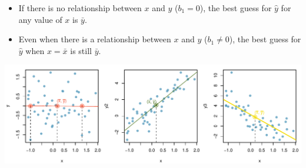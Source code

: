 \documentclass[slidestop,compress,mathserif,12pt,t,professionalfonts,xcolor=table]{beamer}
\begin{document}
\begin{frame}

\vfill


\pause

\begin{itemize}

\item If there is no relationship between $x$ and $y$ ($b_1 = 0$), the best guess for $\hat{y}$ for any value of $x$ is $\bar{y}$.

\item Even when there is a relationship between $x$ and $y$ ($b_1 \ne 0$), the best guess for $\hat{y}$ when $x = \bar{x}$ is still $\bar{y}$.



\end{itemize}

\begin{center}
\includegraphics[width=\textwidth]{figures/mean/mean}
\end{center}

\vfill

\end{frame}


\begin{frame}
\frametitle{}


\end{frame}

\end{document}
